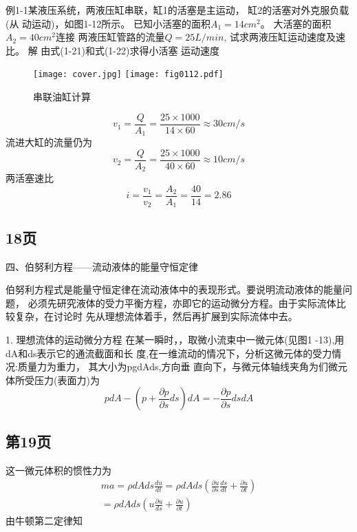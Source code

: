 例1-1某液压系统，两液压缸串联，缸1的活塞是主运动，
缸2的活塞对外克服负载(从 动运动)，如图1-12所示。
已知小活塞的面积$A_1=14 cm^2 $。
大活塞的面积$A_2=40 cm^2 $连接 
两液压缸管路的流量$Q = 25 L/min$,
试求两液压缸运动速度及速比。
解	由式(1-21)和式(1-22)求得小活塞
运动速度

\begin{figure}
  \centering
  \ifOpenSource
  \texttt{[image: cover.jpg]}
  \else
  \texttt{[image: fig0112.pdf]}%
  \fi
  \caption{串联油缸计算}
  \label{fig:0112}%
  \end{figure}


\[{v_1} = \frac{Q}{{{A_1}}} = \frac{{25 \times 1000}}{{14 \times 60}} \approx 30cm/s\]
流进大缸的流量仍为
\[{v_2} = \frac{Q}{{{A_2}}} = \frac{{25 \times 1000}}{{40 \times 60}} \approx 10cm/s\]
两活塞速比
\[i = \frac{{{v_1}}}{{{v_2}}} = \frac{{{A_2}}}{{{A_1}}} = \frac{{40}}{{14}} = 2.86\]
\subsection{18页}
四、伯努利方程——流动液体的能量守恒定律

伯努利方程式是能量守恒定律在流动液体中的表现形式。要说明流动液体的能量问题， 必须先研究液体的受力平衡方程，亦即它的运动微分方程。由于实际流体比较复杂，在讨论时 先从理想流体着手，然后再扩展到实际流体中去。

1.	理想流体的运动微分方程
在某一瞬时，，取微小流束中一微元体(见图1 -13),用dA和ds表示它的通流截面和长 度,在一维流动的情况下，分析这微元体的受力情况:质量力为重力，
其大小为pgdAds,方向垂 直向下，与微元体轴线夹角为们微元体所受压力(表面力)为
\[pdA - \left( {p + \frac{{\partial p}}{{\partial s}}ds} \right)dA = -\frac{{\partial p}}{{\partial s}}dsdA\]

\subsection{第19页}
这一微元体积的惯性力为
\[\begin{array}{l}
  ma = \rho dAds\frac{{du}}{{dt}} = \rho dAds\left( {\frac{{\partial u}}{{\partial s}}\frac{{ds}}{{dt}} + \frac{{\partial u}}{{\partial t}}} \right)\\
   = \rho dAds\left( {u\frac{{\partial u}}{{ds}} + \frac{{\partial u}}{{\partial t}}} \right)
  \end{array}\]
由牛顿第二定律知



